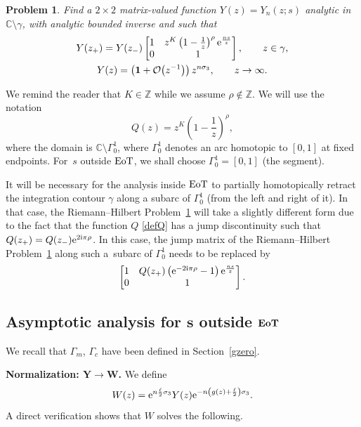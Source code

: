 \documentclass[10pt,a4paper]{amsart}
\numberwithin{equation}{section}
\newtheorem{problem}[Theorem]{Problem}
\theoremstyle{definition}
\def\le{\left}
\def\ri{\right}
\def\be{\begin{equation}}
\def\ee{\end{equation}}
\def \1{\mathbf 1}
\def\C{{\mathbb C}}
\def\Z{{\mathbb Z}}
\def\s{\sigma}
\begin{document}
\begin{problem}
\label{RHPY1} Find a $2\times 2$ matrix-valued function $Y(z) = Y_n(z;s)$ analytic in $\C \setminus \gamma$, with analytic bounded inverse and such that
\begin{gather*}
Y(z_+) = Y(z_-) \begin{bmatrix}
1 & z^{{ {K}}}\le(1-\frac 1 z\ri)^{ {\rho}} {\rm e}^{\frac {ns}z}\\
0 & 1
\end{bmatrix}, \qquad z\in \gamma,
\\
Y(z) = \le(\1 + \mathcal O\bigl(z^{-1}\bigr)\ri) z^{n\s_3}, \qquad z\to \infty.
\end{gather*}
\end{problem}
We remind the reader that ${ {K}} \in \Z$ while we assume ${ {\rho}} \not\in \Z$.
We will use the notation
\be
\label{defQ}
Q(z) = z^{ {K}}\le(1 - \frac 1 z \ri)^{ {\rho}},
\ee
where the domain is $\C\setminus \Gamma_0^1$, where $\Gamma_0^1$ denotes an arc homotopic to $[0,1]$ at fixed endpoints. For~$s$ outside ${\rm EoT}$, we shall choose $\Gamma_0^1=[0,1]$ (the segment).

It will be necessary for the analysis inside ${\rm EoT}$ to partially homotopically retract the integration contour $\gamma$ along a subarc of $\Gamma_0^1$ (from the left and right of it). In that case, the Riemann--Hilbert Problem~\ref{RHPY1} will take a slightly different form due to the fact that the function $Q$ \eqref{defQ} has a jump discontinuity such that $Q(z_+) = Q(z_-) {\rm e}^{2{\rm i}\pi \rho}$. In this case, the jump matrix of the Riemann--Hilbert Problem~\ref{RHPY1} along such a~subarc of $\Gamma_0^1$ needs to be replaced by
\[
 \begin{bmatrix}
1 & Q(z_+) \le({\rm e}^{-2{\rm i}\pi \rho} - 1\ri) {\rm e}^{\frac {ns}z}\\
0 & 1
\end{bmatrix}.
\]

\subsection[Asymptotic analysis for $s$ outside EoT]{Asymptotic analysis for $\boldsymbol{s}$ outside $\boldsymbol{{\rm EoT}}$}
\label{outsideEoT}

We recall that $\Gamma_m$, $\Gamma_c$ have been defined in Section~\ref{gzero}.

{\bf Normalization: $\boldsymbol{Y\to W}$.}
We define
\be
\label{defW}
W(z)= {\rm e}^{n\frac \ell 2 \s_3} Y(z) {\rm e}^{ -n\le(g(z) + \frac \ell 2\ri)\s_3}.
\ee
A direct verification shows that $W$ solves the following.
\end{document}
